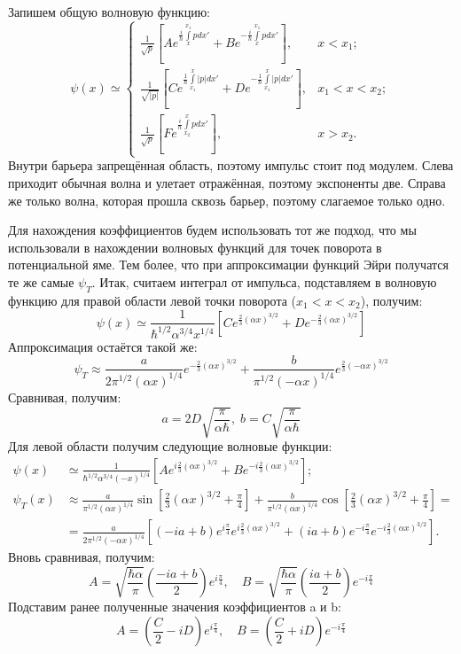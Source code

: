 Запишем общую волновую функцию:
\[
\psi(x) \simeq 
\begin{cases}
    \frac{1}{\sqrt{p}}\left[ Ae^{\frac{i}{\hbar}\int\limits_x^{x_1} p dx'} + Be^{-\frac{i}{\hbar}\int\limits_x^{x_1} p dx'} \right], & x<x_1;\\
    \frac{1}{\sqrt{|p|}}\left[ Ce^{\frac{1}{\hbar}\int\limits_{x_1}^{x} |p| dx'} + De^{-\frac{1}{\hbar}\int\limits_{x_1}^{x} |p| dx'} \right], & x_1< x < x_2;\\
    \frac{1}{\sqrt{p}}\left[ Fe^{\frac{i}{\hbar}\int\limits_{x_2}^{x} p dx'}\right], & x > x_2.
\end{cases}
\]
Внутри барьера запрещённая область, поэтому импульс стоит под модулем. Слева приходит обычная волна и улетает отражённая, поэтому экспоненты две. Справа же только волна, которая прошла сквозь барьер, поэтому слагаемое только одно. 

Для нахождения коэффициентов будем использовать тот же подход, что мы использовали в нахождении волновых функций для точек поворота в потенциальной яме. Тем более, что при аппроксимации функций Эйри получатся те же самые $\psi_T$. Итак, считаем интеграл от импульса, подставляем в волновую функцию для правой области левой точки поворота ($x_1 < x < x_2$), получим:
\[
    \psi(x) \simeq \frac{1}{\hbar^{1/2}\alpha^{3/4}x^{1/4}}\left[ Ce^{\frac{2}{3}(\alpha x)^{3/2}} + De^{-\frac{2}{3}(\alpha x)^{3/2}} \right]
\]
Аппроксимация остаётся такой же:
\[
    \psi_T \approx \frac{a}{2\pi^{1/2}(\alpha x)^{1/4}}e^{-\frac{2}{3}(\alpha x)^{3/2}} + \frac{b}{\pi^{1/2}(-\alpha x)^{1/4}}e^{\frac{2}{3}(-\alpha x)^{3/2}}
\]
Сравнивая, получим:
\[
a = 2D\sqrt{\frac{\pi}{\alpha\hbar}},\; b = C\sqrt{\frac{\pi}{\alpha\hbar}}
\]
Для левой области получим следующие волновые функции:
\begin{align*}
    \psi(x) &\simeq \frac{1}{\hbar^{1/2}\alpha^{3/4}(-x)^{1/4}}\left[ Ae^{i\frac{2}{3}(\alpha x)^{3/2}} + Be^{-i\frac{2}{3}(\alpha x)^{3/2}} \right];\\
    \psi_T(x) &\approx \frac{a}{\pi^{1/2}(\alpha x)^{1/4}}\sin\left[\frac{2}{3}(\alpha x)^{3/2} + \frac{\pi}{4}\right] + \frac{b}{\pi^{1/2}(\alpha x)^{1/4}}\cos\left[\frac{2}{3}(\alpha x)^{3/2} + \frac{\pi}{4}\right] = \\ 
    & = \frac{a}{2\pi^{1/2}(-\alpha x)^{1/4}}\left[ (-ia + b)e^{i\frac{\pi}{4}}e^{i\frac{2}{3}(\alpha x)^{3/2}} + (ia+b)e^{-i\frac{\pi}{4}}e^{-i\frac{2}{3}(\alpha x)^{3/2}} \right].
\end{align*}
Вновь сравнивая, получим:
\[
A = \sqrt{\frac{\hbar\alpha}{\pi}}\left( \frac{-ia + b}{2} \right)e^{i\frac{\pi}{4}},\quad B = \sqrt{\frac{\hbar\alpha}{\pi}}\left( \frac{ia + b}{2} \right)e^{-i\frac{\pi}{4}}
\]
Подставим ранее полученные значения коэффициентов a и b:
\[
    A = \left( \frac{C}{2} - iD \right)e^{i\frac{\pi}{4}}, \quad B = \left( \frac{C}{2} + iD \right)e^{-i\frac{\pi}{4}}
\]

